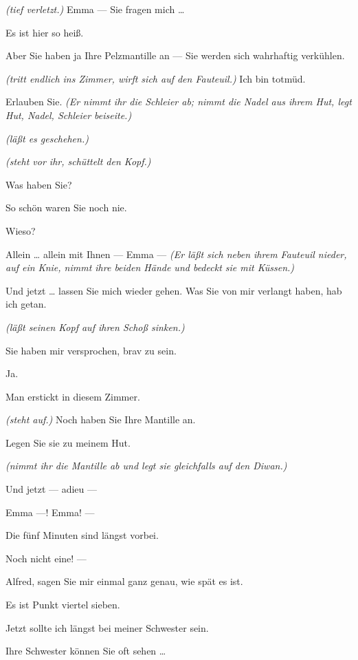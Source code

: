 \documentclass[
	final,
	a4paper,
	ngerman,
	mpinclude = true, %
	twoside = true,
	open = right,
	cleardoublepage = plain,
	DIV = 13,
	BCOR = 1cm,
	titlepage = firstiscover,
	]{scrbook}
\newcommand{\direction}[1]{\textit{(#1)}}
\newcommand{\thecharacter}[1]{\textup{\textsc{#1}}}
\newcommand{\theherr}{\thecharacter{Junger Herr}}
\newcommand{\thefrau}{\thecharacter{Junge Frau}}
\newcommand{\character}[1]{\item[#1:]}
\newcommand{\herr}{\character{\theherr}}
\newcommand{\frau}{\character{\thefrau}}
\begin{document}
\begin{play}
	\herr
	\direction{tief verletzt.} Emma --- Sie fragen mich \ldots{}

	\frau
	Es ist hier so heiß.

	\herr
	Aber Sie haben ja Ihre Pelzmantille an --- Sie werden sich wahrhaftig verkühlen.

	\frau
	\direction{tritt endlich ins Zimmer, wirft sich auf den Fauteuil.} Ich bin totmüd.

	\herr
	Erlauben Sie. \direction{Er nimmt ihr die Schleier ab; nimmt die Nadel aus ihrem Hut, legt Hut, Nadel, Schleier beiseite.}

	\frau
	\direction{läßt es geschehen.}

	\herr
	\direction{steht vor ihr, schüttelt den Kopf.}

	\frau
	Was haben Sie?

	\herr
	So schön waren Sie noch nie.

	\frau
	Wieso?

	\herr
	Allein \ldots{} allein mit Ihnen --- Emma --- \direction{Er läßt sich neben ihrem Fauteuil nieder, auf ein Knie, nimmt ihre beiden Hände und bedeckt sie mit Küssen.}

	\frau
	Und jetzt \ldots{} lassen Sie mich wieder gehen. Was Sie von mir verlangt haben, hab ich getan.

	\herr
	\direction{läßt seinen Kopf auf ihren Schoß sinken.}

	\frau
	Sie haben mir versprochen, brav zu sein.

	\herr
	Ja.

	\frau
	Man erstickt in diesem Zimmer.

	\herr
	\direction{steht auf.} Noch haben Sie Ihre Mantille an.

	\frau
	Legen Sie sie zu meinem Hut.

	\herr
	\direction{nimmt ihr die Mantille ab und legt sie gleichfalls auf den Diwan.}

	\frau
	Und jetzt --- adieu ---

	\herr
	Emma ---! Emma! ---

	\frau
	Die fünf Minuten sind längst vorbei.

	\herr
	Noch nicht eine! ---

	\frau
	Alfred, sagen Sie mir einmal ganz genau, wie spät es ist.

	\herr
	Es ist Punkt viertel sieben.

	\frau
	Jetzt sollte ich längst bei meiner Schwester sein.

	\herr
	Ihre Schwester können Sie oft sehen \ldots{}


\end{play}
\end{document}

